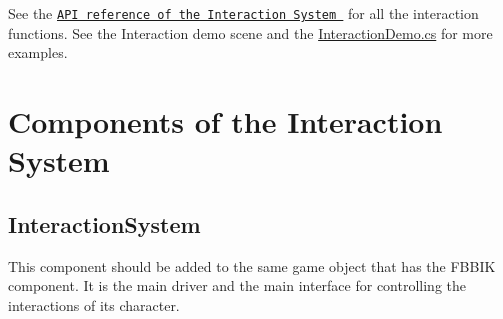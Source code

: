 See the \href{http://www.root-motion.com/finalikdox/html/class_root_motion_1_1_final_i_k_1_1_interaction_system.html}{\tt A\+PI reference of the Interaction System } for all the interaction functions. See the Interaction demo scene and the \mbox{\hyperlink{_interaction_demo_8cs}{Interaction\+Demo.\+cs}} for more examples.\hypertarget{page10_components}{}\section{Components of the Interaction System}\label{page10_components}
\hypertarget{page10_interactionSystem}{}\subsection{Interaction\+System}\label{page10_interactionSystem}
This component should be added to the same game object that has the F\+B\+B\+IK component. It is the main driver and the main interface for controlling the interactions of it\textquotesingle{}s character.

